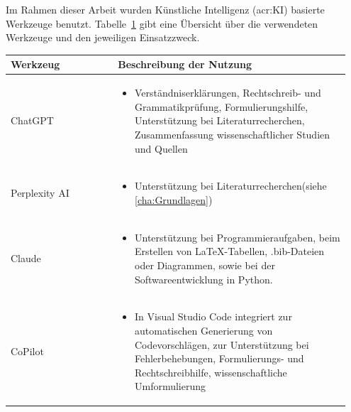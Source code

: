 \setcounter{chapter}{1}

Im Rahmen dieser Arbeit wurden Künstliche Intelligenz (\acrshort{acr:KI}) basierte Werkzeuge benutzt. Tabelle~\ref{tab:anhang_uebersicht_KI_werkzeuge} gibt eine Übersicht über die verwendeten Werkzeuge und den jeweiligen Einsatzzweck.


\begin{table}[hbt]	
	\centering
	\renewcommand{\arraystretch}{1.5}	%
	\label{tab:anhang_uebersicht_KI_werkzeuge}
	\begin{tabular}{>{\raggedright\arraybackslash}p{0.3\linewidth} >{\raggedright\arraybackslash}p{0.65\linewidth}}
		\textbf{Werkzeug} & \textbf{Beschreibung der Nutzung}\\
		\hline
		\hline
		ChatGPT & 
		\vspace{-\topsep}
		\begin{itemize}[noitemsep,topsep=0pt,partopsep=0pt,parsep=0pt]
			\item Verständniserklärungen, Rechtschreib- und Grammatikprüfung, Formulierungshilfe, Unterstützung bei Literaturrecherchen, Zusammenfassung wissenschaftlicher Studien und Quellen
		\end{itemize} \\
		Perplexity AI &
		\vspace{-\topsep}
		\begin{itemize}[noitemsep,topsep=0pt,partopsep=0pt,parsep=0pt]
			\item Unterstützung bei Literaturrecherchen(siehe \autoref{cha:Grundlagen})
		\end{itemize} \\
		Claude &
		\vspace{-\topsep}
		\begin{itemize}[noitemsep,topsep=0pt,partopsep=0pt,parsep=0pt]
			\item Unterstützung bei Programmieraufgaben, beim Erstellen von LaTeX-Tabellen, .bib-Dateien oder Diagrammen, sowie bei der Softwareentwicklung in Python.
		\end{itemize} \\
		CoPilot &
		\vspace{-\topsep}
		\begin{itemize}[noitemsep,topsep=0pt,partopsep=0pt,parsep=0pt]
			\item In Visual Studio Code integriert zur automatischen Generierung von Codevorschlägen, zur Unterstützung bei Fehlerbehebungen, Formulierungs- und Rechtschreibhilfe, wissenschaftliche Umformulierung

\end{itemize}
\end{tabular}
\end{table}
